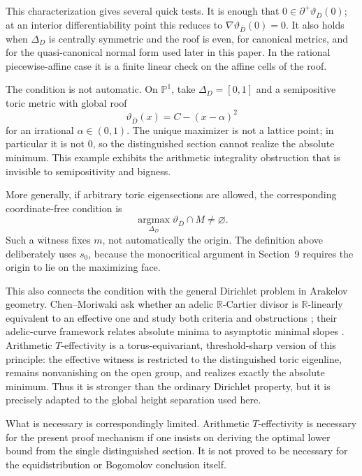 \documentclass[10pt,a4paper]{amsart}
\theoremstyle{plain}
\theoremstyle{plain}
\numberwithin{equation}{section}
\providecommand{\bD}{\overline{D}}
\begin{document}
This characterization gives several quick tests.  It is enough that
\(0\in\partial^+\vartheta_{\bD}(0)\); at an interior differentiability point
this reduces to \(\nabla\vartheta_{\bD}(0)=0\).  It also holds when
\(\Delta_D\) is centrally symmetric and the roof is even, for canonical
metrics, and for the quasi-canonical normal form used later in this paper.  In
the rational piecewise-affine case it is a finite linear check on the affine
cells of the roof.

The condition is not automatic.  On \(\mathbb P^1\), take
\(\Delta_D=[0,1]\) and a semipositive toric metric with global roof
\[
\vartheta_{\bD}(x)=C-(x-\alpha)^2
\]
for an irrational \(\alpha\in(0,1)\).  The unique maximizer is not a lattice
point; in particular it is not \(0\), so the distinguished section cannot
realize the absolute minimum.  This example exhibits the arithmetic
integrality obstruction that is invisible to semipositivity and bigness.

More generally, if arbitrary toric eigensections are allowed, the corresponding
coordinate-free condition is
\[
\operatorname*{argmax}_{\Delta_D}\vartheta_{\bD}\cap M\ne\varnothing.
\]
Such a witness fixes \(m\), not automatically the origin.  The definition
above deliberately uses \(s_0\), because the monocritical argument in
Section~9 requires the origin to lie on the maximizing face.

This also connects the condition with the general Dirichlet problem in
Arakelov geometry.  Chen--Moriwaki ask whether an adelic
\(\mathbb R\)-Cartier divisor is \(\mathbb R\)-linearly equivalent to an
effective one and study both criteria and obstructions
\cite{CMDirichlet,CMDynamics}; their adelic-curve framework relates absolute
minima to asymptotic minimal slopes \cite[Chapter 7]{CMAdelicCurves}.
Arithmetic \(T\)-effectivity is a torus-equivariant, threshold-sharp version
of this principle: the effective witness is restricted to the distinguished
toric eigenline, remains nonvanishing on the open group, and realizes exactly
the absolute minimum.  Thus it is stronger than the ordinary Dirichlet
property, but it is precisely adapted to the global height separation used
here.

What is necessary is correspondingly limited.  Arithmetic \(T\)-effectivity
is necessary for the present proof mechanism if one insists on deriving the
optimal lower bound from the single distinguished section.  It is not proved
to be necessary for the equidistribution or Bogomolov conclusion itself.
\end{document}
